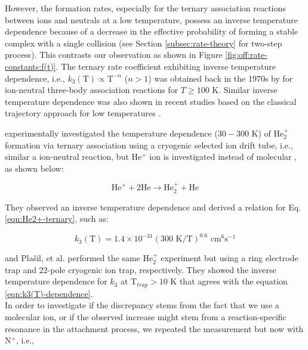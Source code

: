 However, the formation rates, especially for the ternary association reactions
between ions and neutrals at a low temperature, possess an inverse temperature
dependence because of a decrease in the effective probability of forming a
stable complex with a single collision \cite{herbst_dense_1988} (see Section
\ref{subsec:rate-theory} for two-step process). This contrasts our observation
as shown in Figure \ref{fig:off:rate-constants:f(t)}. The ternary rate coefficient exhibiting
inverse temperature dependence, i.e., $k_3 (\text{T}) \propto \text{T}^{-n}$ ($n > 1$) 
was obtained back in the 1970s by \citet{Herbst1979} for ion-neutral
three-body association reactions for $T \geq 100$ K.
Similar inverse temperature dependence was also shown in recent studies based on the classical trajectory approach for low temperatures \cite{perez-rios_communication_2015, greene_universal_2017}.

\citet{bohringer_temperature_1983} experimentally investigated the temperature dependence ($30-300$ K) of He$_2^+$ formation via ternary association using a cryogenic selected ion drift tube, i.e., similar a ion-neutral reaction, but He$^+$ ion is investigated instead of molecular \CD, as shown below:

\begin{equation}
    \text{He}^+ + 2\text{He} \rightarrow \text{He}_2^+ + \text{He}
    \label{eqn:He2+-ternary}
\end{equation}

They observed an inverse temperature dependence and derived a relation for Eq.
\ref{eqn:He2+-ternary}, such as:

\begin{equation}
    k_3 (\text{T}) = 1.4 \times 10^{-31} (300 \text{ K} / \text{T})^{0.6} \text{ cm}^6\text{s}^{-1}
    \label{eqn:k3(T)-dependence}
\end{equation}

\citet{gerlich_experimental_1993} and Pla\v{s}il, et al. \cite{plasil_stabilization_2012} performed the same He$_2^+$ experiment but using a ring electrode trap and 22-pole cryogenic ion trap, respectively. They showed the inverse temperature dependence for $k_3$ at T$_{trap}>10$ K that agrees with the equation \ref{eqn:k3(T)-dependence}.\\

In order to investigate if the discrepancy stems from the fact that we use a
molecular ion, or if the observed increase might stem from a reaction-specific
resonance in the attachment process, we repeated the measurement but now with
N$^+$, i.e.,

